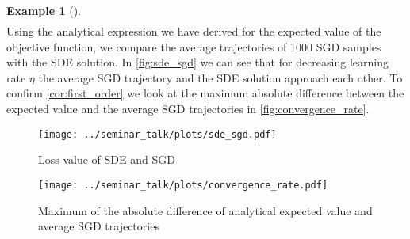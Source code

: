 \documentclass[12pt]{article}
\theoremstyle{definition}
\newtheorem{example}[example]{Example}
\numberwithin{equation}{section}
\newcommand{\R}{\mathbb{R}}
\begin{document}
\begin{example}[\autocite{liStochasticModifiedEquations2019}]
\begin{align*}
\end{align*}
Using the analytical expression we have derived for the expected value of the objective function, we compare the average trajectories of 1000 SGD samples with the SDE solution. In \autoref{fig:sde_sgd} we can see that for decreasing learning rate $\eta$ the average SGD trajectory and the SDE solution approach each other.
To confirm \autoref{cor:first_order} we look at the maximum absolute difference between the expected value and the average SGD trajectories in \autoref{fig:convergence_rate}.

\begin{figure}
  \centering
  \texttt{[image: ../seminar\_talk/plots/sde\_sgd.pdf]}
  \caption{Loss value of SDE and SGD}
  \label{fig:sde_sgd}
\end{figure}
\begin{figure}
  \centering
  \texttt{[image: ../seminar\_talk/plots/convergence\_rate.pdf]}
  \caption{Maximum of the absolute difference of analytical expected value and average SGD trajectories}
  \label{fig:convergence_rate}
\end{figure}
\end{example}
\end{document}
